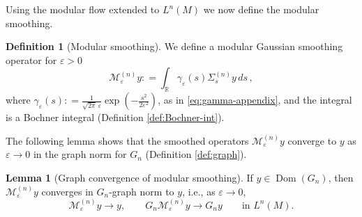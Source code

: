 \documentclass[11pt,a4paper]{article}
\theoremstyle{plain}
\numberwithin{theorem}{section}
\theoremstyle{definition}
\newtheorem{definition}[theorem]{Definition}
\newtheorem{lemma}[theorem]{Lemma}
\newcommand{\?}{\overset{?}{=}}
\newcommand{\defeq}{\mathrel{\mathop:}=}
\newcommand{\ve}{\varepsilon}
\DeclareMathOperator{\Dom}{Dom}
\begin{document}
Using the modular flow extended to $L^n(M)$ we now define the modular smoothing. 
\begin{definition}[Modular smoothing]
    We define a modular Gaussian smoothing operator for $\varepsilon>0$
\begin{equation}\label{eq:modular-gaussian-smoothing}
  \mathcal M_\varepsilon^{(n)}y\defeq \int_{\mathbb R}\gamma_\varepsilon(s)\Sigma_s^{(n)}y\,ds\,,
\end{equation}
where $\gamma_\varepsilon(s)\defeq \frac{1}{\sqrt{2\pi}\,\varepsilon}
  \exp\left(-\frac{s^2}{2\varepsilon^2}\right)$, as in \eqref{eq:gamma-appendix}, and the integral is a Bochner integral (Definition \ref{def:Bochner-int}). 
\end{definition}
The following lemma shows that the smoothed operators $\mathcal M_\ve^{(n)} y$ converge to $y$ as $\ve\to0$ in the graph norm for $G_n$ (Definition \ref{def:graph}).
\begin{lemma}[Graph convergence of modular smoothing]
\label{lem:modular-smoothing-fixed}
If $y\in\Dom(G_n)$, then $\mathcal M_\ve^{(n)}y$ converges in $G_n$-graph norm to $y$, i.e., as $\ve\to0$,
\begin{equation}
    \mathcal M_\varepsilon^{(n)}y\longrightarrow y,
  \qquad
  G_n\mathcal M_\varepsilon^{(n)}y\longrightarrow G_ny
  \qquad
  \text{in }L^n(M).
\end{equation}
\end{lemma}
\end{document}
